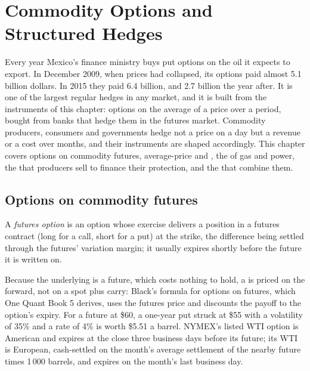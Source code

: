 \chapter{Commodity Options and Structured Hedges}\label{ch:m3:commodity-options-and-structured-hedges}

Every year Mexico's finance ministry buys put options on the oil it expects to export. In
December 2009, when prices had collapsed, its options paid almost 5.1 billion dollars. In 2015 they paid 6.4 billion, and 2.7 billion
the year after. It is one of the largest regular hedges in any market, and it is built from
the instruments of this chapter: options on the average of a price over a period, bought from
banks that hedge them in the futures market. Commodity producers, consumers and governments
hedge not a price on a day but a revenue or a cost over months, and their instruments are
shaped accordingly. This chapter covers options on commodity futures, average-price and
, the  of gas and power, the  that producers sell
to finance their protection, and the  that combine them.

\section{Options on commodity futures}

\begin{definition}\label{def:m3:commodity-options-and-structured-hedges:fo}
A \emph{futures option} is an option whose exercise delivers a position in a
futures contract (long for a call, short for a put) at the strike, the difference being settled
through the futures' variation margin; it usually expires shortly before the future it is written on.
\end{definition}

Because the underlying is a future, which costs nothing to hold, a  is priced on the
forward, not on a spot plus carry: Black's formula for options on futures, which One Quant Book 5
derives, uses the futures price and discounts the payoff to the option's expiry. For a future at \$60,
a one-year put struck at \$55 with a volatility of 35\% and a rate of 4\% is worth \$5.51 a barrel. NYMEX's
listed WTI option is American and expires at the close three business days before its future; its WTI
 is European, cash-settled on the month's average settlement of the nearby future times
1\,000 barrels, and expires on the month's last business day.

